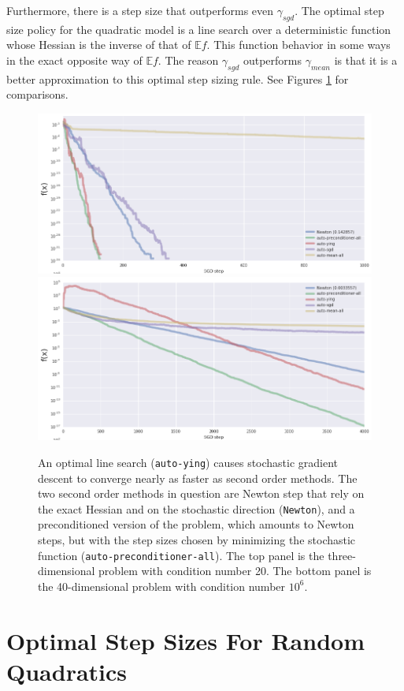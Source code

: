 \documentclass{article}
\newcommand{\E}{\mathbb{E}}
\begin{document}
Furthermore, there is a step size that outperforms even $\gamma_{sgd}$. The optimal step size policy for the quadratic model is a line search over a deterministic function whose Hessian is the inverse of that of $\E f$. This function behavior in some ways in the exact opposite way of $\E f$. The reason $\gamma_{sgd}$ outperforms $\gamma_{mean}$ is that it is a better approximation to this optimal step sizing rule. See Figures \ref{fig:faster} for comparisons.

\begin{figure}
    \centering
    \includegraphics[width=12cm]{faster-cond=20-dim=3}
    \includegraphics[width=12cm]{faster-cond=1e6-dim=40}
    \caption{An optimal line search ({\tt auto-ying}) causes stochastic gradient descent to converge nearly as faster as second order methods. The two second order methods in question are Newton step that rely on the exact Hessian and on the stochastic direction ({\tt Newton}), and a preconditioned version of the problem, which amounts to Newton steps, but with the step sizes chosen by minimizing the stochastic function ({\tt auto-preconditioner-all}). The top panel is the three-dimensional problem with condition number 20. The bottom panel is the 40-dimensional problem with condition number $10^6$.}
    \label{fig:faster}
\end{figure}

\section{Optimal Step Sizes For Random Quadratics}
\end{document}
